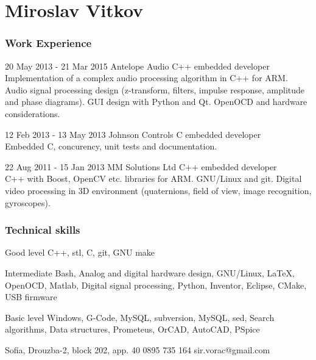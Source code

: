 \documentclass{tccv}
\begin{document}
\part{Miroslav Vitkov}


\section{Work Experience}
\begin{eventlist}
\item{20 May 2013 - 21 Mar 2015}
     {Antelope Audio}
     {C++ embedded developer} \\
Implementation of a complex audio processing algorithm in C++ for ARM.
Audio signal processing design (z-transform, filters, impulse response, amplitude and phase diagrams).
GUI design with Python and Qt.
OpenOCD and hardware considerations.

\item{12 Feb 2013 - 13 May 2013}
     {Johnson Controls}
     {C embedded developer} \\
Embedded C, concurency, unit tests and documentation.

\item{22 Aug 2011 - 15 Jan 2013}
     {MM Solutions Ltd}
     {C++ embedded developer} \\
C++ with Boost, OpenCV etc. libraries for ARM.
GNU/Linux and git.
Digital video processing in 3D environment (quaternions, field of view, image recognition, gyroscopes).
\end{eventlist}


\section{Technical skills}
\begin{factlist}
\item{Good level}
     {C++, stl, C, git, GNU make}

\item{Intermediate}
     {Bash, Analog and digital hardware design, GNU/Linux, LaTeX, OpenOCD, Matlab, Digital signal processing, Python, Inventor, Eclipse, CMake, USB firmware}

\item{Basic level}
     {Windows, G-Code, MySQL, subversion, MySQL, sed, Search algorithms, Data structures, Prometeus, OrCAD, AutoCAD, PSpice}
\end{factlist}


\personal
    {Sofia, Drouzba-2, block 202, app. 40}
    {0895 735 164}
    {sir.vorac@gmail.com}
\end{document}
